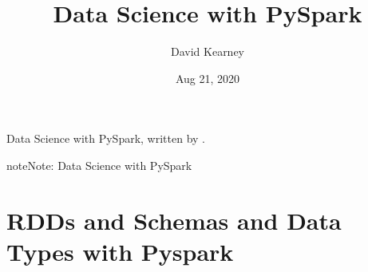 \documentclass[letterpaper,10pt,english]{sphinxmanual}
\title{Data Science with PySpark}
\date{Aug 21, 2020}
\author{David Kearney}
\begin{document}
\pagestyle{empty}
\sphinxmaketitle
\pagestyle{plain}
\sphinxtableofcontents
\pagestyle{normal}
\label{\detokenize{intro::doc}}


Data Science with PySpark, written by .

\begin{sphinxadmonition}{note}{Note:}
Data Science with PySpark
\end{sphinxadmonition}


\chapter{RDDs and Schemas and Data Types with Pyspark}
\label{\detokenize{2020-08-21-RDDs and Schemas and Data Types with Pyspark:rdds-and-schemas-and-data-types-with-pyspark}}\label{\detokenize{2020-08-21-RDDs and Schemas and Data Types with Pyspark::doc}}
\begin{sphinxVerbatim}[commandchars=\\\{\}]
  
    
\end{sphinxVerbatim}

\begin{sphinxVerbatim}[commandchars=\\\{\}]
\end{sphinxVerbatim}

\begin{sphinxVerbatim}[commandchars=\\\{\}]
\end{sphinxVerbatim}

\begin{sphinxVerbatim}[commandchars=\\\{\}]
\end{sphinxVerbatim}
\end{document}
